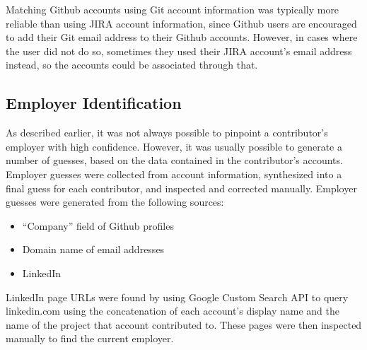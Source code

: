 Matching Github accounts using Git account information was typically more reliable than using JIRA account information, since Github users are encouraged to add their Git email address to their Github accounts. However, in cases where the user did not do so, sometimes they used their JIRA account's email address instead, so the accounts could be associated through that.
\subsection{Employer Identification}
As described earlier, it was not always possible to pinpoint a contributor's employer with high confidence. However, it was usually possible to generate a number of guesses, 
based on the data contained in the contributor's accounts. Employer guesses were collected from account information, synthesized into a final guess for each contributor, and inspected and corrected manually.
Employer guesses were generated from the following sources:
\begin{itemize}
	\item ``Company'' field of Github profiles
	\item Domain name of email addresses
	\item LinkedIn
\end{itemize}
LinkedIn page URLs were found by using Google Custom Search API to query linkedin.com using the concatenation of each account's display name and the name of the project that account contributed to. These pages were then inspected manually to find the current employer. 